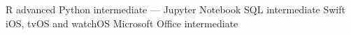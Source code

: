 \begin{cvskills}
  \cvskill
    {R}
    {advanced}
  \cvskill
    {Python}
    {intermediate — Jupyter Notebook}
  \cvskill
    {SQL}
    {intermediate}
  \cvskill
    {Swift}
    {iOS, tvOS and watchOS}
  \cvskill
    {Microsoft Office}
    {intermediate}
\end{cvskills}
